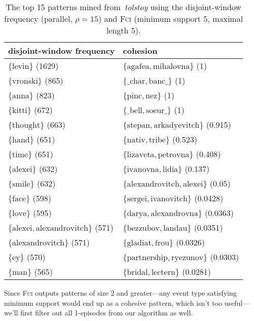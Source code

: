 \begin{table}
\centering

\begin{tabulary}{\textwidth}{L|L}

disjoint-window frequency & cohesion \\
\hline
$ \{ \text{levin} \} $ (1629) & $ \{ \text{agafea}, \text{mihalovna} \} $ (1) \\
$ \{ \text{vronski} \} $ (865) & $ \{ \text{\_char}, \text{banc\_} \} $ (1) \\
$ \{ \text{anna} \} $ (823) & $ \{ \text{pinc}, \text{nez} \} $ (1) \\
$ \{ \text{kitti} \} $ (672) & $ \{ \text{\_bell}, \text{soeur\_} \} $ (1) \\
$ \{ \text{thought} \} $ (663) & $ \{ \text{stepan}, \text{arkadyevitch} \} $ (0.915) \\
$ \{ \text{hand} \} $ (651) & $ \{ \text{nativ}, \text{tribe} \} $ (0.523) \\
$ \{ \text{time} \} $ (651) & $ \{ \text{lizaveta}, \text{petrovna} \} $ (0.408) \\
$ \{ \text{alexei} \} $ (632) & $ \{ \text{ivanovna}, \text{lidia} \} $ (0.137) \\
$ \{ \text{smile} \} $ (632) & $ \{ \text{alexandrovitch}, \text{alexei} \} $ (0.05) \\
$ \{ \text{face} \} $ (598) & $ \{ \text{sergei}, \text{ivanovitch} \} $ (0.0428) \\
$ \{ \text{love} \} $ (595) & $ \{ \text{darya}, \text{alexandrovna} \} $ (0.0363) \\
$ \{ \text{alexei}, \text{alexandrovitch} \} $ (571) & $ \{ \text{bezzubov}, \text{landau} \} $ (0.0351) \\
$ \{ \text{alexandrovitch} \} $ (571) & $ \{ \text{gladiat}, \text{frou} \} $ (0.0326) \\
$ \{ \text{ey} \} $ (570) & $ \{ \text{partnership}, \text{ryezunov} \} $ (0.0303) \\
$ \{ \text{man} \} $ (565) & $ \{ \text{bridal}, \text{lectern} \} $ (0.0281) \\

\end{tabulary}

\caption{The top 15 patterns mined from~\emph{tolstoy} using the disjoint-window frequency (parallel, $ \rho = 15 $) and \textsc{Fci} (minimum support 5, maximal length 5).}
\end{table}

Since \textsc{Fci} outputs patterns of size 2 and greater---any event type satisfying minimum support would end up as a cohesive pattern, which isn't too useful---we'll first filter out all 1-episodes from our algorithm as well.

